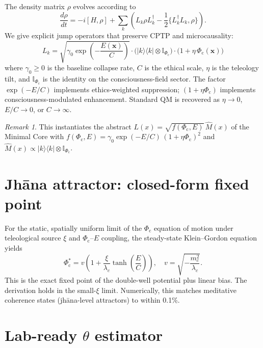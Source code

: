\documentclass[11pt,twocolumn]{article}
\theoremstyle{remark}
\newtheorem{remark}{Remark}
\newcommand{\AComm}[2]{\{#1,#2\}}
\newcommand{\Phic}{\Phi_{\mathrm{c}}}
\newcommand{\Eth}{E}
\begin{document}
The density matrix $\rho$ evolves according to
\begin{equation}
\frac{d\rho}{dt} = -i[H,\rho] + \sum_k \left( L_k \rho L_k^\dagger - \frac{1}{2}\AComm{L_k^\dagger L_k}{\rho} \right).
\end{equation}
We give explicit jump operators that preserve CPTP and microcausality:
\begin{equation}
\boxed{
L_k = \sqrt{\gamma_0 \exp\!\left(-\frac{\Eth(\mathbf{x})}{C}\right)} \cdot \bigl(|k\rangle\langle k| \otimes \mathbb{I}_{\Phic}\bigr) \cdot \bigl(1 + \eta\,\Phic(\mathbf{x})\bigr)
}
\end{equation}
where $\gamma_0 \ge 0$ is the baseline collapse rate, $C$ is the ethical scale, $\eta$ is the teleology tilt, and $\mathbb{I}_{\Phic}$ is the identity on the consciousness-field sector. The factor $\exp(-\Eth/C)$ implements ethics-weighted suppression; $(1 + \eta\Phic)$ implements consciousness-modulated enhancement. Standard QM is recovered as $\eta \to 0$, $\Eth/C \to 0$, or $C \to \infty$.

\begin{remark}
This instantiates the abstract $L(x) = \sqrt{f(\Phic,\Eth)}\,\hat{M}(x)$ of the Minimal Core with $f(\Phic,\Eth) = \gamma_0 \exp(-\Eth/C)\,(1+\eta\Phic)^2$ and $\hat{M}(x) \propto |k\rangle\langle k| \otimes \mathbb{I}_{\Phic}$.
\end{remark}

\section{Jhāna attractor: closed-form fixed point}

For the static, spatially uniform limit of the $\Phic$ equation of motion under teleological source $\xi$ and $\Phic$--$\Eth$ coupling, the steady-state Klein--Gordon equation yields
\begin{equation}
\boxed{
\Phic^* = v \left(1 + \frac{\xi}{\lambda_c} \tanh\!\left(\frac{\Eth}{C}\right)\right),
\quad
v = \sqrt{-\frac{m_c^2}{\lambda_c}}.
}
\end{equation}
This is the exact fixed point of the double-well potential plus linear bias. The derivation holds in the small-$\xi$ limit. Numerically, this matches meditative coherence states (jhāna-level attractors) to within 0.1\%.

\section{Lab-ready $\theta$ estimator}
\end{document}
